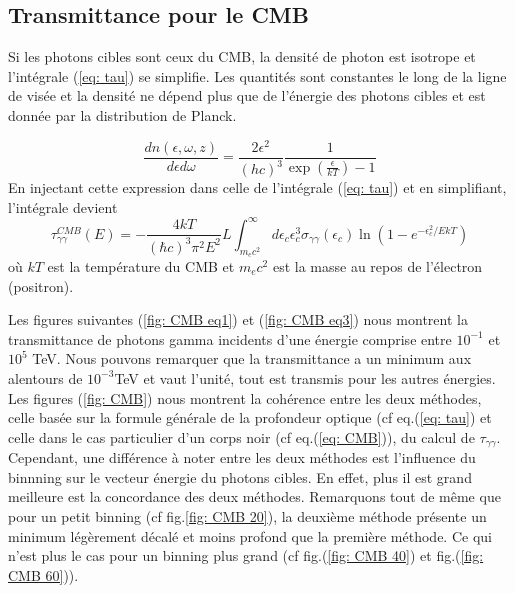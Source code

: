 \documentclass[a4paper,12pt,twoside]{article}
\begin{document}
\subsection{Transmittance  pour le CMB}

Si les photons cibles sont ceux du CMB, la densité de photon est isotrope et l'intégrale (\ref{eq: tau}) se simplifie. Les quantités sont constantes le long de la ligne de visée et la densité ne dépend plus que de l'énergie des photons cibles et est donnée par la distribution de Planck.

\begin{equation}
	\frac{d n(\epsilon, \omega, z)}{d \epsilon d \omega} = \frac{2 \epsilon^2}{(h c)^3}\frac{1}{\exp\left(\frac{\epsilon}{kT}\right) - 1}
    \label{eq: density BB}
\end{equation}
En injectant cette expression dans celle de l'intégrale (\ref{eq: tau}) et en simplifiant, l'intégrale devient
\begin{equation}
	\tau_{\gamma \gamma}^{CMB}(E) = - \frac{4kT}{(\hbar c)^3 \pi^2 E^2} L \int_{m_e c^2}^\infty d \epsilon_c \epsilon_c^3 \sigma_{\gamma \gamma}(\epsilon_c) \ln(1 - e^{-\epsilon_c^2/EkT})
    \label{eq: CMB}
\end{equation}
où $kT$ est la température du CMB et $m_e c^2$ est la masse au repos de l'électron (positron).

Les figures suivantes (\ref{fig: CMB eq1}) et (\ref{fig: CMB eq3}) nous montrent la transmittance de photons gamma incidents d'une énergie comprise entre $10^{-1}$ et $10^5$ \si{\TeV}. Nous pouvons remarquer que la transmittance a un minimum aux alentours de $10^{-3}$\si{\TeV} et vaut l'unité, tout est transmis pour les autres énergies. Les figures (\ref{fig: CMB}) nous montrent la cohérence entre les deux méthodes, celle basée sur la formule générale de la profondeur optique (cf eq.(\ref{eq: tau}) et celle dans le cas particulier d'un corps noir (cf eq.(\ref{eq: CMB})), du calcul de $\tau_{\gamma \gamma}$. Cependant, une différence à noter entre les deux méthodes est l'influence du binnning sur le vecteur énergie du photons cibles. En effet, plus il est grand meilleure est la concordance des deux méthodes. Remarquons tout de même que pour un petit binning (cf fig.\ref{fig: CMB 20}), la deuxième méthode présente un minimum légèrement décalé et moins profond que la première méthode. Ce qui n'est plus le cas pour un binning plus grand (cf fig.(\ref{fig: CMB 40}) et fig.(\ref{fig: CMB 60})).
\end{document}
